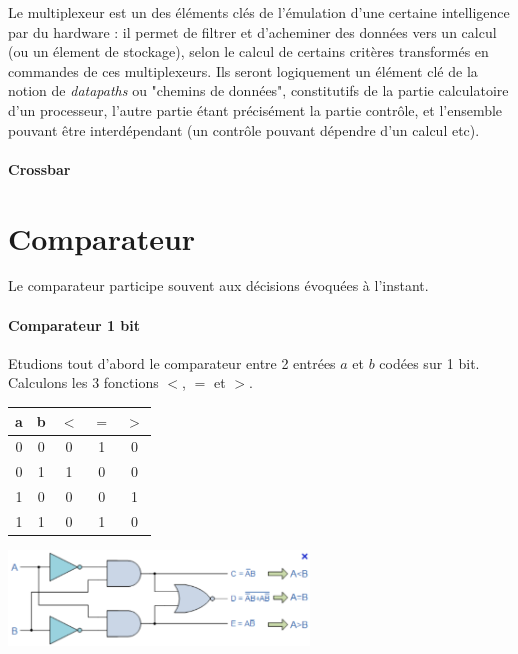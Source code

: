 Le multiplexeur est un des éléments clés de l'émulation d'une certaine intelligence
par du hardware : il permet de filtrer et d'acheminer des données vers un calcul (ou un élement de stockage), selon le calcul de certains critères transformés
en commandes de ces multiplexeurs. Ils seront logiquement un élément clé de la notion de {\it datapaths} ou "chemins de données", constitutifs de la partie calculatoire
d'un processeur, l'autre partie étant précisément la partie contrôle, et l'ensemble pouvant être interdépendant (un contrôle pouvant dépendre d'un calcul etc).

\paragraph{Crossbar}


\section{Comparateur}
Le comparateur participe souvent aux décisions évoquées à l'instant.

\paragraph{Comparateur 1 bit}
Etudions tout d'abord le comparateur entre 2 entrées $a$ et $b$ codées sur 1 bit.
Calculons les 3 fonctions $<$, $=$ et $>$.
\begin{center}
   \begin{minipage}[t]{4cm}
     \vspace{0pt}
     \centering
     \begin{tabular}{|c|c||c|c|c|}
       \hline
       a & b & $<$ & $=$ & $>$ \\ \hline
       0 & 0 &  0  &  1  & 0   \\ \hline
       0 & 1 &  1  &  0  & 0   \\ \hline
       1 & 0 &  0  &  0  & 1   \\ \hline
       1 & 1 &  0  &  1  & 0   \\ \hline
     \end{tabular}
   \end{minipage}%
   \begin{minipage}[t]{9cm}
     \vspace{-5pt}
     \centering
     \includegraphics[width=8cm]{./figures/comparator-1.png}
   \end{minipage}
\end{center} %

